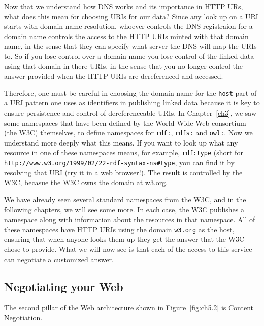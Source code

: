 Now that we understand how DNS works and its importance in HTTP URs, what does this mean
for choosing URIs for our data? Since any look up on a URI starts with  domain name 
resolution, whoever controls the DNS registraion for a
domain name controls the access to the HTTP URIs minted with that domain
name, in the sense that they can specify what server the DNS will map the URIs to. 
So if you lose control over a domain name you lose control of the
linked data using that domain in there URIs, in the sense that you no
longer control the answer provided when the HTTP URIs are dereferenced
and accessed.

Therefore, one must be careful in choosing the domain name for the \texttt{host}
part of a URI pattern one uses as identifiers in publishing linked data
because it is key to ensure persistence and control of dereferenceable
URIs.  In Chapter~\ref{ch3}, we saw some namespaces that have been defined 
by the World Wide Web consortium (the W3C) themselves, to define namespaces for 
\texttt{rdf:}, \texttt{rdfs:} and \texttt{owl:}. Now we understand more deeply what this
means. If you want to look up what any resource in one of these namespaces means, 
for example, \texttt{rdf:type} 
(short for \texttt{http://www.w3.org/1999/02/22-rdf-syntax-ns\#type}, you can 
find it by resolving that URI (try it in a web browser!).  The result is controlled by the 
W3C, becasue the W3C owns the domain at w3.org. 


We have already seen several standard namespaces from the W3C, and in the following 
chapters, we will see some more.  In each case, the W3C publishes a namespace along 
with information about the resources in that namespace.  All of these namespaces have HTTP 
URIs using the domain  \texttt{w3.org} as the host, ensuring that when anyone looks 
them up they get the answer that the W3C chose to provide.  What we will now see is
that each of the access to this service can negotiate a customized
answer.

\hypertarget{negotiating-your-web}{%
\subsection{Negotiating your Web}\label{negotiating-your-web}}

The second pillar of the Web architecture shown in Figure~\ref{fig:ch5.2} is  Content Negotiation.

